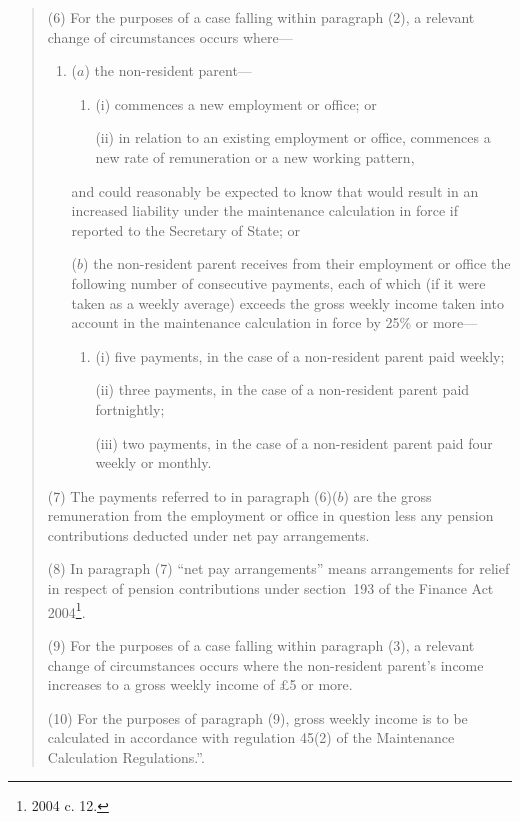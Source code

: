 \documentclass[12pt,a4paper]{article}
\begin{document}
\begin{quotation}
(6) For the purposes of a case falling within paragraph (2), a relevant change of circumstances occurs where—
\begin{enumerate}\item[]
($a$) the non-resident parent—
\begin{enumerate}\item[]
(i) commences a new employment or office; or

(ii) in relation to an existing employment or office, commences a new rate of remuneration or a new working pattern,
\end{enumerate}
and could reasonably be expected to know that would result in an increased liability under the maintenance calculation in force if reported to the Secretary of State; or

($b$) the non-resident parent receives from their employment or office the following number of consecutive payments, each of which (if it were taken as a weekly average) exceeds the gross weekly income taken into account in the maintenance calculation in force by 25\% or more—
\begin{enumerate}\item[]
(i) five payments, in the case of a non-resident parent paid weekly;

(ii) three payments, in the case of a non-resident parent paid fortnightly;

(iii) two payments, in the case of a non-resident parent paid four weekly or monthly.
\end{enumerate}
\end{enumerate}

(7) The payments referred to in paragraph (6)($b$)  are the gross remuneration from the employment or office in question less any pension contributions deducted under net pay arrangements.

(8) In paragraph (7) “net pay arrangements” means arrangements for relief in respect of pension contributions under section~193 of the Finance Act 2004\footnote{2004 c. 12.}.

(9) For the purposes of a case falling within paragraph (3), a relevant change of circumstances occurs where the non-resident parent’s income increases to a gross weekly income of £5 or more.

(10) For the purposes of paragraph (9), gross weekly income is to be calculated in accordance with regulation 45(2) of the Maintenance Calculation Regulations.”.
\end{quotation}
\end{document}
